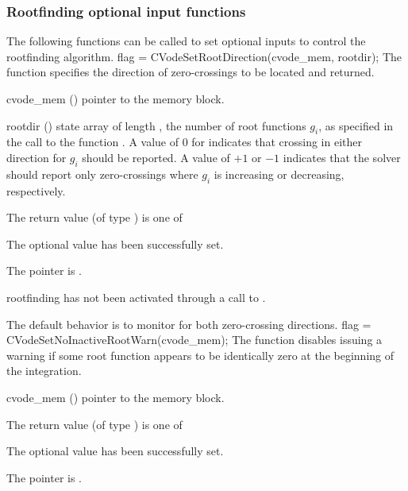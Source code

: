 \subsubsection{Rootfinding optional input functions}\label{sss:optin_root}
The following functions can be called to set optional inputs to control the
rootfinding algorithm.
{
flag = CVodeSetRootDirection(cvode\_mem, rootdir);
}
{
  The function  specifies the direction of
  zero-crossings to be located and returned.
}
{
  \begin{args}
  \item[cvode\_mem] ()
    pointer to the {\cvode} memory block.
  \item[rootdir] ()
    state array of length , the number of root functions $g_i$, as specified
    in the call to the function .  A value of $0$ for
     indicates that crossing in either direction for $g_i$
    should be reported.  A value of $+1$ or $-1$ indicates that the solver should
    report only zero-crossings where $g_i$ is increasing or decreasing, respectively.
  \end{args}
}
{
  The return value  (of type ) is one of
  \begin{args}
  \item[\Id{CV\_SUCCESS}]
    The optional value has been successfully set.
  \item[\Id{CV\_MEM\_NULL}]
    The  pointer is .
  \item[\Id{CV\_ILL\_INPUT}]
    rootfinding has not been activated through a call to .
  \end{args}
}
{
  The default behavior is to monitor for both zero-crossing directions.
}
{
flag = CVodeSetNoInactiveRootWarn(cvode\_mem);
}
{
  The function  disables issuing a warning
  if some root function appears to be identically zero at the beginning of the integration.
}
{
  \begin{args}
  \item[cvode\_mem] ()
    pointer to the {\cvode} memory block.
  \end{args}
}
{
  The return value  (of type ) is one of
  \begin{args}
  \item[\Id{CV\_SUCCESS}]
    The optional value has been successfully set.
  \item[\Id{CV\_MEM\_NULL}]
    The  pointer is .
  \end{args}
}
